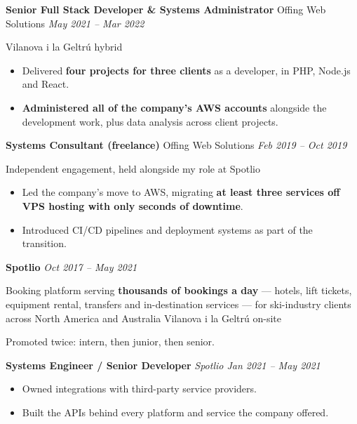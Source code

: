 \documentclass[10pt,a4paper]{article}
\newcommand{\job}[3]{%
  \vspace{0.4em}%
  \noindent\textbf{#1} \textcolor{muted}{\textbar} #2 \hfill \textcolor{muted}{\small\textit{#3}}%
  \par\vspace{0.1em}%
}
\newcommand{\companyhdr}[3]{%
  \vspace{0.4em}%
  \noindent\textbf{#2} \hfill \textcolor{muted}{\small\textit{#3}}%
  \par\vspace{-0.1em}%
  \noindent\textcolor{muted}{\small #1}\par\vspace{0.1em}%
}
\newcommand{\subrole}[2]{%
  \vspace{0.18em}%
  \noindent\hspace{0.8em}\textbf{\small #1} \hfill \textcolor{muted}{\small\textit{#2}}%
  \par\vspace{0.05em}%
}
\begin{document}
\job{Senior Full Stack Developer \& Systems Administrator}{Offing Web Solutions}{May 2021 -- Mar 2022}
\vspace{-0.15em}
\noindent\textcolor{muted}{\small Vilanova i la Geltrú \textbullet{} hybrid}\par\vspace{0.1em}
\begin{itemize}
  \item Delivered \textbf{four projects for three clients} as a developer, in PHP, Node.js
  and React.
  \item \textbf{Administered all of the company's AWS accounts} alongside the development
  work, plus data analysis across client projects.
\end{itemize}

\job{Systems Consultant (freelance)}{Offing Web Solutions}{Feb 2019 -- Oct 2019}
\vspace{-0.15em}
\noindent\textcolor{muted}{\small Independent engagement, held alongside my role at Spotlio}\par\vspace{0.1em}
\begin{itemize}
  \item Led the company's move to AWS, migrating \textbf{at least three services off VPS
  hosting with only seconds of downtime}.
  \item Introduced CI/CD pipelines and deployment systems as part of the transition.
\end{itemize}

\companyhdr{Booking platform serving \textbf{thousands of bookings a day} --- hotels, lift
tickets, equipment rental, transfers and in-destination services --- for ski-industry
clients across North America and Australia \textbullet{} Vilanova i la Geltrú \textbullet{}
on-site}{Spotlio}{Oct 2017 -- May 2021}
\vspace{0.1em}
\noindent\hspace{0.8em}\textcolor{muted}{\small Promoted twice: intern, then junior,
then senior.}\par

\subrole{Systems Engineer / Senior Developer}{Spotlio \textbullet{} Jan 2021 -- May 2021}
\begin{itemize}[leftmargin=1.9em]
  \item Owned integrations with third-party service providers.
  \item Built the APIs behind every platform and service the company offered.
\end{itemize}
\end{document}
